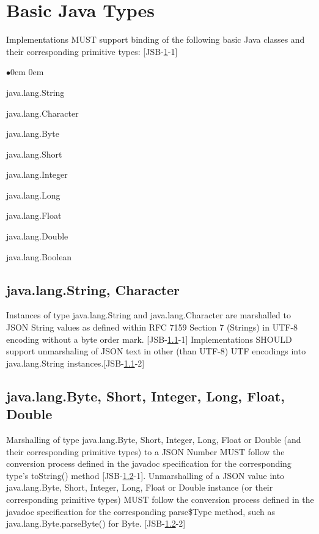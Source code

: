 \section{Basic Java Types}
\label{sec:basic}
Implementations MUST support binding of the following basic Java classes and their corresponding primitive types: [JSB-\ref{sec:basic}-1]
\begin{list}{$\bullet$}{\parsep 0em  0em}
\item java.lang.String
\item java.lang.Character
\item java.lang.Byte
\item java.lang.Short
\item java.lang.Integer
\item java.lang.Long
\item java.lang.Float
\item java.lang.Double
\item java.lang.Boolean
\end{list}

\subsection{java.lang.String, Character}
\label{subsec:string}
Instances of type java.lang.String and java.lang.Character are marshalled to JSON String values as defined within RFC 7159 Section 7 (Strings) \cite{rfc7159} in UTF-8 encoding without a byte order mark. [JSB-\ref{subsec:string}-1] 
Implementations SHOULD support unmarshaling of JSON text in other (than UTF-8) UTF encodings into java.lang.String instances.[JSB-\ref{subsec:string}-2]

\subsection{java.lang.Byte, Short, Integer, Long, Float, Double}
\label{subsec:number}
Marshalling of type java.lang.Byte, Short, Integer, Long, Float or Double (and their corresponding primitive types) to a JSON Number
MUST follow the conversion process defined in the javadoc specification for the corresponding type's toString() method [JSB-\ref{subsec:number}-1]. 
Unmarshalling of a JSON value into java.lang.Byte, Short, Integer, Long, Float or Double instance (or their corresponding primitive types) 
MUST follow the conversion process defined in the javadoc specification for the corresponding
parse\${Type} method, such as java.lang.Byte.parseByte() for Byte. [JSB-\ref{subsec:number}-2]

